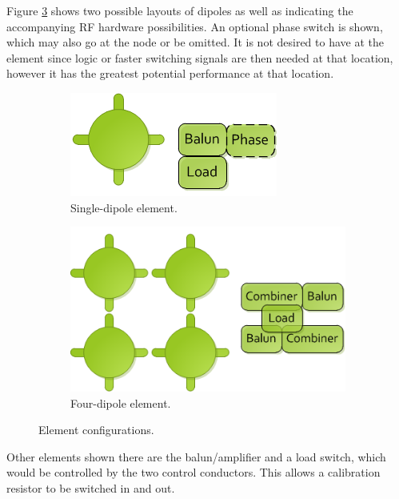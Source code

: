 \documentclass[11pt]{article}
\begin{document}
Figure \ref{fig:elements} shows two possible layouts of dipoles as well as indicating the accompanying RF hardware possibilities.  An optional phase switch is shown, which may also go at the node or be omitted.  It is not desired to have at the element since logic or faster switching signals are then needed at that location, however it has the greatest potential performance at that location.
\begin{figure}
\begin{subfigure}[h]{0.5\textwidth}
\centering
\includegraphics[width=\textwidth]{Element1.png}
\caption{Single-dipole element.}
\label{fig:element1}
\end{subfigure}
\begin{subfigure}{0.5\textwidth}
\centering
\includegraphics[width=\textwidth]{Element4.png}
\caption{Four-dipole element.}
\label{fig:element4}
\end{subfigure}
\caption{Element configurations.}
\label{fig:elements}
\end{figure}

Other elements shown there are the balun/amplifier and a load switch, which would be controlled by the two control conductors.  This allows a calibration resistor to be switched in and out.
\end{document}
